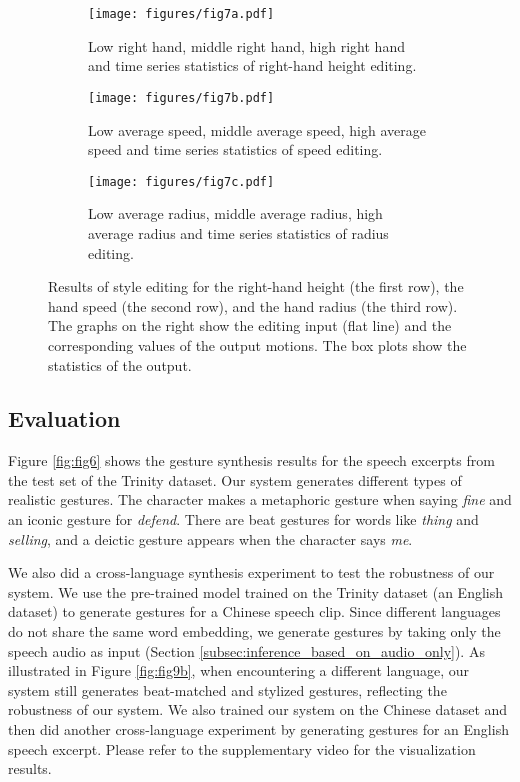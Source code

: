 \documentclass[acmtog,authorversion]{acmart}
\begin{document}
\begin{figure*}[t]
    \centering
    \begin{subfigure}[t]{\textwidth}
        \centering
        \texttt{[image: figures/fig7a.pdf]}
        \caption{Low right hand, middle right hand, high right hand and time series statistics of right-hand height editing.}
        \label{fig:fig7a}
    \end{subfigure}
    \begin{subfigure}[t]{\textwidth}
        \centering
        \texttt{[image: figures/fig7b.pdf]}
        \caption{Low average speed, middle average speed, high average speed and time series statistics of speed editing.}
        \label{fig:fig7b}
    \end{subfigure}
    \begin{subfigure}[t]{\textwidth}
        \centering
        \texttt{[image: figures/fig7c.pdf]}
        \caption{Low average radius, middle average radius, high average radius and time series statistics of radius editing.}
        \label{fig:fig7c}
    \end{subfigure}
    \caption{Results of style editing for the right-hand height (the first row), the hand speed (the second row), and the hand radius (the third row). The graphs on the right show the editing input (flat line) and the corresponding values of the output motions. The box plots show the statistics of the output.}
    \label{fig:fig7}
    \Description{}
\end{figure*}

\subsection{Evaluation}
\label{subsec:evaluation}
Figure \ref{fig:fig6} shows the gesture synthesis results for the speech excerpts from the test set of the Trinity dataset. Our system generates different types of realistic gestures. The character makes a metaphoric gesture when saying \emph{fine} and an iconic gesture for \emph{defend}. There are beat gestures for words like \emph{thing} and \emph{selling}, and a deictic gesture appears when the character says \emph{me}.

We also did a cross-language synthesis experiment to test the robustness of our system. We use the pre-trained model trained on the Trinity dataset (an English dataset) to generate gestures for a Chinese speech clip. Since different languages do not share the same word embedding, we generate gestures by taking only the speech audio as input (Section \ref{subsec:inference_based_on_audio_only}). As illustrated in Figure \ref{fig:fig9b}, when encountering a different language, our system still generates beat-matched and stylized gestures, reflecting the robustness of our system. We also trained our system on the Chinese dataset and then did another cross-language experiment by generating gestures for an English speech excerpt. Please refer to the supplementary video for the visualization results.
\end{document}

